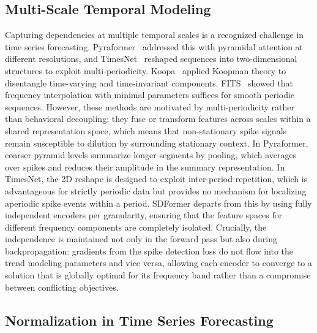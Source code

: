 \documentclass[journal]{IEEEtran}
\begin{document}
\subsection{Multi-Scale Temporal Modeling}

Capturing dependencies at multiple temporal scales is a recognized
challenge in time series forecasting.
Pyraformer~\cite{pyraformer} addressed this with pyramidal attention at
different resolutions, and TimesNet~\cite{timesnet} reshaped sequences into
two-dimensional structures to exploit multi-periodicity.
Koopa~\cite{koopa} applied Koopman theory to disentangle time-varying and
time-invariant components.
FITS~\cite{fits} showed that frequency interpolation with minimal parameters
suffices for smooth periodic sequences.
However, these methods are motivated by multi-periodicity rather than
behavioral decoupling: they fuse or transform features across scales within
a shared representation space, which means that non-stationary spike signals
remain susceptible to dilution by surrounding stationary context.
In Pyraformer, coarser pyramid levels summarize longer segments by pooling,
which averages over spikes and reduces their amplitude in the summary
representation.
In TimesNet, the 2D reshape is designed to exploit inter-period repetition,
which is advantageous for strictly periodic data but provides no mechanism
for localizing aperiodic spike events within a period.
SDFormer departs from this by using fully independent encoders per
granularity, ensuring that the feature spaces for different frequency
components are completely isolated.
Crucially, the independence is maintained not only in the forward pass but
also during backpropagation: gradients from the spike detection loss do not
flow into the trend modeling parameters and vice versa, allowing each
encoder to converge to a solution that is globally optimal for its
frequency band rather than a compromise between conflicting objectives.

\subsection{Normalization in Time Series Forecasting}
\end{document}

